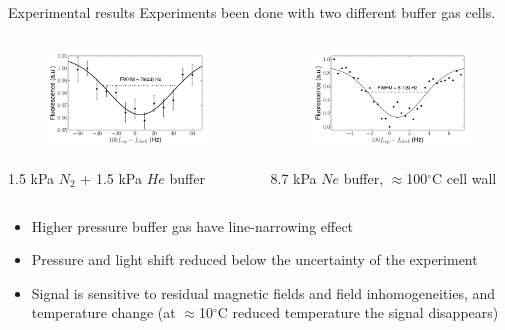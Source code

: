 \begin{block}{Experimental results}
  Experiments been done with two different buffer gas cells.
  \begin{columns}
    \begin{column}{.49\textwidth}
      \begin{center}
      \begin{figure}
         \includegraphics[width=.9\linewidth]{figures/1500N2_1500He_buffer}
      \end{figure}
      1.5 kPa $N_2$ + 1.5 kPa $He$ buffer
      \end{center}
    \end{column}
    \begin{column}{.49\textwidth}
      \begin{center}
      \begin{figure}
         \includegraphics[width=.9\linewidth]{figures/8700Ne_buffer}
      \end{figure}
      8.7 kPa $Ne$ buffer, $\approx$100$^\circ$C cell wall
      \end{center}
    \end{column}
    \end{columns}
    \begin{itemize}
    \item Higher pressure buffer gas have line-narrowing effect
    \item Pressure and light shift reduced below the uncertainty of the experiment
    \item Signal is sensitive to residual magnetic fields and field inhomogeneities, and temperature change (at $\approx$10$^\circ$C reduced temperature the signal disappears)
    \end{itemize}
\end{block}
